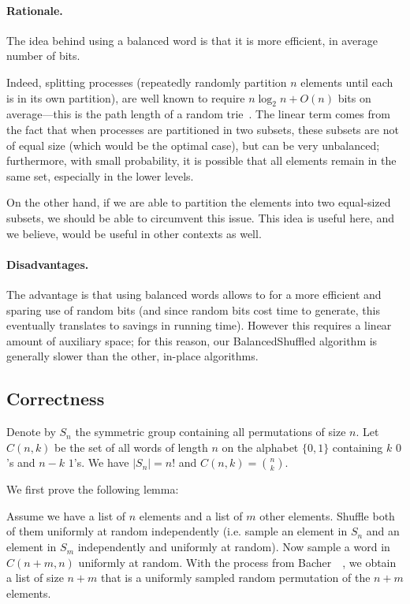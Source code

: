 \documentclass[letter,11pt,en]{quick-document}
\begin{document}
\paragraph{Rationale.}

The idea behind using a balanced word is that it is more efficient, in
average number of bits.

Indeed, splitting processes (repeatedly randomly partition $n$ elements
until each is in its own partition), are well known to require
$n\log_2 n + O(n)$ bits on average---this is the path length of a random
trie~\cite{FlSe09}. The linear term comes from the fact that when
processes are partitioned in two subsets, these subsets are not of equal
size (which would be the optimal case), but can be very unbalanced;
furthermore, with small probability, it is possible that all elements
remain in the same set, especially in the lower levels.

On the other hand, if we are able to partition the elements into two
equal-sized subsets, we should be able to circumvent this issue. This idea
is useful here, and we believe, would be useful in other contexts as well.

\paragraph{Disadvantages.} The advantage is that using balanced words
allows to for a more efficient and sparing use of random bits (and since
random bits cost time to generate, this eventually translates to savings
in running time). However this requires a linear amount of auxiliary
space; for this reason, our BalancedShuffled algorithm is generally slower
than the other, in-place algorithms.

\subsection{Correctness}

Denote by $S_n$ the symmetric group containing all permutations of size $n$. Let $C(n,k)$ be the set of all words of length $n$ on the alphabet $\{0,1\}$ containing $k$ $0$'s and $n-k$ $1$'s. We have $|S_n| = n!$ and $C(n,k) = \binom{n}{k}$.

We first prove the following lemma:

\begin{lemma}
  Assume we have a list of $n$ elements and a list of $m$ other elements.
  Shuffle both of them uniformly at random independently (i.e. sample an
  element in $S_n$ and an element in $S_m$ independently and uniformly at
  random). Now sample a word in $C(n+m,n)$ uniformly at random. With the
  process from Bacher~\etal~\cite{BaBoJa14}, we obtain a list of size
  $n+m$ that is a uniformly sampled random permutation of the $n+m$
  elements.
\end{lemma}
\end{document}
